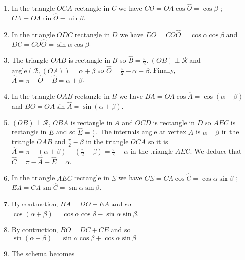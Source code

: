 \begin{enumerate}
\begin{center}
\end{center}

\item In the triangle $OCA$ rectangle in $C$ we have
  $CO = OA \cos \widehat{O} = \cos \beta$ ;
  $CA = OA \sin \widehat{O} = \sin \beta$.
\item In the triangle $ODC$ rectangle in $D$ we have
  $DO = CO \widehat{O} = \cos \alpha \cos \beta$ and
  $DC = CO \widehat{O} = \sin \alpha \cos \beta$.
\item The triangle $OAB$ is rectangle in $B$ so $\widehat{B} = \frac{\pi}{2}$.
  $(OB) \perp \mathcal R$ and
  $\text{angle}\left(\mathcal R, (OA)\right) = \alpha+\beta$
  so $\widehat{O} = \frac{\pi}{2} - \alpha - \beta$. Finally,
  $\widehat{A} = \pi - \widehat{O} - \widehat{B} = \alpha + \beta$.
\item In the triangle $OAB$ rectangle in $B$ we have
  $BA = OA \cos \widehat{A} = \cos\left(\alpha+\beta\right)$
  and
  $BO = OA \sin \widehat{A} = \sin\left(\alpha+\beta\right)$.
\item $(OB) \perp \mathcal R$,
  $OBA$ is rectangle in $A$ and $OCD$ is rectangle in $D$ so
  $AEC$ is rectangle in $E$ and so $\widehat{E} = \frac{\pi}{2}$.
  The internals angle at vertex $A$ is
  $\alpha+\beta$ in the triangle $OAB$ and $\frac{\pi}{2} - \beta$ in
  the triangle $OCA$ so it is
  $\widehat{A} = \pi - \left(\alpha+\beta\right) -
  \left(\frac{\pi}{2} - \beta\right) = \frac{\pi}{2} - \alpha$ in
  the triangle $AEC$. We deduce that
  $\widehat{C} = \pi - \widehat{A} - \widehat{E} = \alpha$.
\item In the triangle $AEC$ rectangle in $E$ we have
  $CE = CA \cos \widehat{C} = \cos \alpha \sin \beta$ ;
  $EA = CA \sin \widehat{C} = \sin \alpha \sin \beta$.
\item By contruction,
  $BA = DO - EA$ and so
  $\cos\left(\alpha+\beta\right) =
  \cos \alpha \cos \beta -
  \sin \alpha \sin \beta$.
\item By contruction,
  $BO = DC + CE$ and so
  $\sin\left(\alpha+\beta\right) =
  \sin \alpha \cos \beta + \cos \alpha \sin \beta$
\item The schema becomes
  \begin{center}
\end{center}
\end{enumerate}
